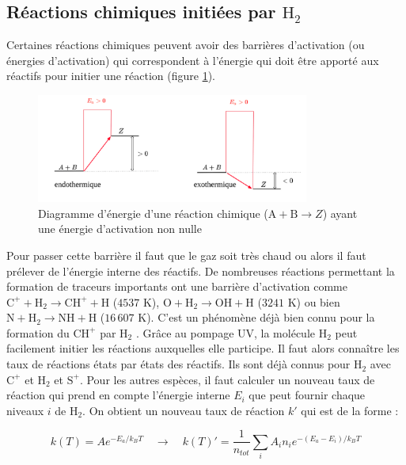 \subsection{Réactions chimiques initiées par $\mathrm{H}_2$}

Certaines réactions chimiques peuvent avoir des barrières d'activation (ou énergies d'activation) qui correspondent à l'énergie qui doit être apporté aux réactifs pour initier une réaction (figure \ref{fig:H2:Ea}). 

\begin{figure}[!h]
    \centering
    \includegraphics[trim = {0 0 0 0cm },clip,width=0.8\textwidth]{figure/type46/Ea.pdf}
    \caption{Diagramme d'énergie d'une réaction chimique ($\mathrm{A}+\mathrm{B}\rightarrow Z$) ayant une énergie d'activation non nulle}
    \label{fig:H2:Ea}
\end{figure}


Pour passer cette barrière il faut que le gaz soit très chaud ou alors il faut prélever de l'énergie interne des réactifs. De nombreuses réactions permettant la formation de traceurs importants ont une barrière d'activation comme $\mathrm{C}^+ + \mathrm{H}_2 \rightarrow \mathrm{CH}^+ + \mathrm{H}$ ($4537$ K),  $\mathrm{O} + \mathrm{H}_2 \rightarrow \mathrm{OH} + \mathrm{H}$  ($3241$ K) ou bien $\mathrm{N} + \mathrm{H}_2 \rightarrow \mathrm{NH} + \mathrm{H}$ ($16\,607$ K). C'est un phénomène déjà bien connu pour la formation du $\mathrm{CH}^+$ par $\mathrm{H}_2$ \cite{Herraez, Zanchet}. Grâce au pompage UV, la molécule $\mathrm{H}_2$ peut facilement initier les réactions auxquelles elle participe. Il faut alors connaître les taux de réactions états par états des réactifs. Ils sont déjà connus pour $\mathrm{H}_2$ avec $\mathrm{C}^+$ et $\mathrm{H}_2$ et $\mathrm{S}^+$. Pour les autres espèces, il faut calculer un nouveau taux de réaction qui prend en compte l'énergie interne $E_i$ que peut fournir chaque niveaux $i$ de $\mathrm{H}_2$. On obtient un nouveau taux de réaction $k'$ qui est de la forme :

\begin{equation}
    k(T) = A e^{- E_a / k_BT} \quad \rightarrow \quad  k(T)' =  \frac{1}{n_{tot}} \sum_i A_i n_i e^{- (E_a - E_i) / k_BT}
\end{equation}

